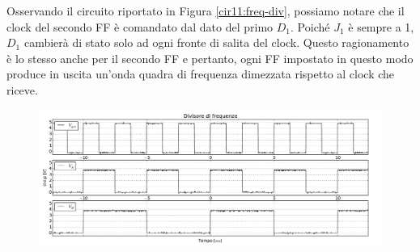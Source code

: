 Osservando il circuito riportato in Figura \ref{cir11:freq-div}, possiamo notare che il clock del secondo FF è comandato dal dato del primo $D_1$.
Poiché $J_1$ è sempre a 1, $D_1$ cambierà di stato solo ad ogni fronte di salita del clock.
Questo ragionamento è lo stesso anche per il secondo FF e pertanto, ogni FF impostato in questo modo produce in uscita un'onda quadra di frequenza dimezzata rispetto al clock che riceve.

\begin{figure}[htpc]
\centering
	\includegraphics[width=.98\textwidth]{../E11/latex/gfreq.pdf}
	\caption{}
	\label{gr11:freq}
\end{figure}
